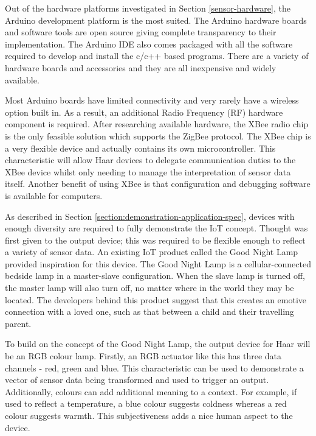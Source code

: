         Out of the hardware platforms investigated in Section \ref{sensor-hardware}, the Arduino development platform is the most suited. The Arduino hardware boards and software tools are open source giving complete transparency to their implementation. The Arduino IDE also comes packaged with all the software required to develop and install the c/c++ based programs. There are a variety of hardware boards and accessories and they are all inexpensive and widely available.

        Most Arduino boards have limited connectivity and very rarely have a wireless option built in. As a result, an additional Radio Frequency (RF) hardware component is required. After researching available hardware, the XBee radio chip is the only feasible solution which supports the ZigBee protocol. The XBee chip is a very flexible device and actually contains its own microcontroller. This characteristic will allow Haar devices to delegate communication duties to the XBee device whilst only needing to manage the interpretation of sensor data itself. Another benefit of using XBee is that configuration and debugging software is available for computers.

        As described in Section \ref{section:demonstration-application-spec}, devices with enough diversity are required to fully demonstrate the IoT concept. Thought was first given to the output device; this was required to be flexible enough to reflect a variety of sensor data. An existing IoT product called the Good Night Lamp provided inspiration for this device. The Good Night Lamp is a cellular-connected bedside lamp in a master-slave configuration. When the slave lamp is turned off, the master lamp will also turn off, no matter where in the world they may be located. The developers behind this product suggest that this creates an emotive connection with a loved one, such as that between a child and their travelling parent.

        To build on the concept of the Good Night Lamp, the output device for Haar will be an RGB colour lamp. Firstly, an RGB actuator like this has three data channels - red, green and blue. This characteristic can be used to demonstrate a vector of sensor data being transformed and used to trigger an output. Additionally, colours can add additional meaning to a context. For example, if used to reflect a temperature, a blue colour suggests coldness whereas a red colour suggests warmth. This subjectiveness adds a nice human aspect to the device.

